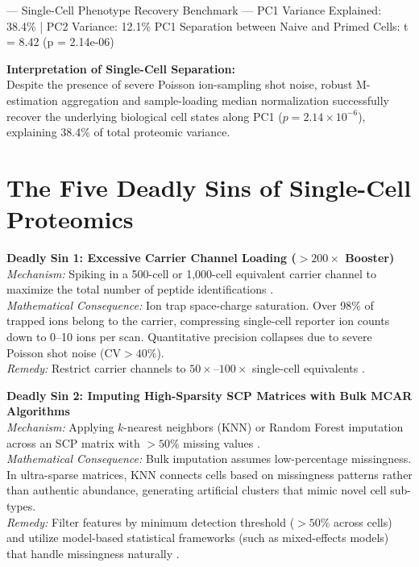 \documentclass[11pt,twoside,openright]{book}
\begin{document}
\begin{routput}
--- Single-Cell Phenotype Recovery Benchmark ---
PC1 Variance Explained: 38.4\% | PC2 Variance: 12.1\%
PC1 Separation between Naive and Primed Cells: t = 8.42 (p = 2.14e-06)
\end{routput}

\begin{biologicalinsight}
\textbf{Interpretation of Single-Cell Separation:}\\
Despite the presence of severe Poisson ion-sampling shot noise, robust M-estimation aggregation and sample-loading median normalization successfully recover the underlying biological cell states along PC1 ($p = 2.14 \times 10^{-6}$), explaining 38.4\% of total proteomic variance.
\end{biologicalinsight}

\section{The Five Deadly Sins of Single-Cell Proteomics}

\begin{pitfallbox}
\textbf{Deadly Sin 1: Excessive Carrier Channel Loading ($>200\times$ Booster)}\\
\textit{Mechanism:} Spiking in a 500-cell or 1,000-cell equivalent carrier channel to maximize the total number of peptide identifications \cite{slavov2021scope2, cheung2021carrier}.\\
\textit{Mathematical Consequence:} Ion trap space-charge saturation. Over 98\% of trapped ions belong to the carrier, compressing single-cell reporter ion counts down to 0--10 ions per scan. Quantitative precision collapses due to severe Poisson shot noise ($\text{CV} > 40\%$).\\
\textit{Remedy:} Restrict carrier channels to $50\times$--$100\times$ single-cell equivalents \cite{vanderaa2021scp}.
\end{pitfallbox}

\begin{pitfallbox}
\textbf{Deadly Sin 2: Imputing High-Sparsity SCP Matrices with Bulk MCAR Algorithms}\\
\textit{Mechanism:} Applying $k$-nearest neighbors (KNN) or Random Forest imputation across an SCP matrix with $>50\%$ missing values \cite{brunner2022ultra}.\\
\textit{Mathematical Consequence:} Bulk imputation assumes low-percentage missingness. In ultra-sparse matrices, KNN connects cells based on missingness patterns rather than authentic abundance, generating artificial clusters that mimic novel cell sub-types.\\
\textit{Remedy:} Filter features by minimum detection threshold ($>50\%$ across cells) and utilize model-based statistical frameworks (such as mixed-effects models) that handle missingness naturally \cite{choi2014msstats}.
\end{pitfallbox}
\end{document}
